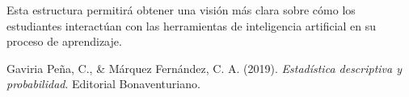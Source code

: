 \documentclass{article}
\begin{document}
Esta estructura permitirá obtener una visión más clara sobre cómo los estudiantes interactúan con las herramientas de inteligencia artificial en su proceso de aprendizaje.


\begin{thebibliography}{9}

  Gaviria Peña, C., \& Márquez Fernández, C. A. (2019). \textit{Estadística descriptiva y probabilidad}. Editorial Bonaventuriano. 

\end{thebibliography}
  
\end{document}
